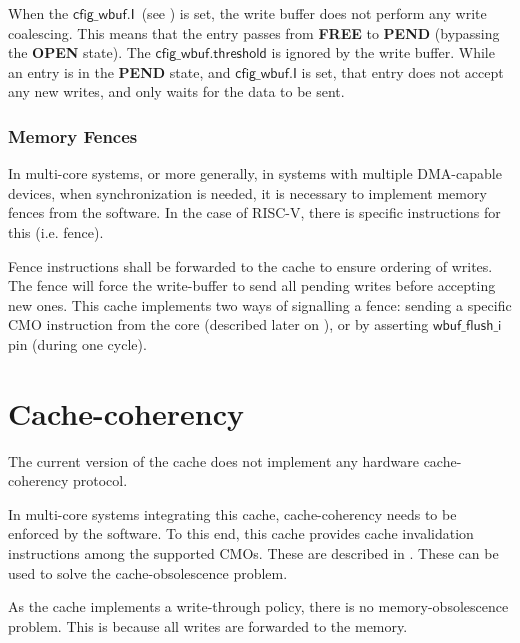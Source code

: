 \documentclass[10pt,titlepage,twoside]{book}
\begin{document}
When the $\mathsf{cfig\_wbuf.I}$~(see ) is set, the write buffer does not perform any write coalescing. This means that the entry passes from \textbf{FREE} to \textbf{PEND} (bypassing the \textbf{OPEN} state). The $\mathsf{cfig\_wbuf.threshold}$ is ignored by the write buffer. While an entry is in the \textbf{PEND} state, and $\mathsf{cfig\_wbuf.I}$ is set, that entry does not accept any new writes, and only waits for the data to be sent.


\subsubsection{Memory Fences}

In multi-core systems, or more generally, in systems with multiple \acs{DMA}-capable devices, when synchronization is needed, it is necessary to implement memory fences from the software.
In the case of RISC-V, there is specific instructions for this (i.e. fence).

Fence instructions shall be forwarded to the cache to ensure ordering of writes. The fence will force the write-buffer to send all pending writes before accepting new ones.
This cache implements two ways of signalling a fence: sending a specific \ac{CMO} instruction from the core (described later on ), or by asserting $\mathsf{wbuf\_flush\_i}$ pin (during one cycle).


\section{Cache-coherency}

The current version of the cache does not implement any hardware cache-coherency protocol.

In multi-core systems integrating this cache, cache-coherency needs to be enforced by the software. To this end, this cache provides cache invalidation instructions among the supported \acp{CMO}. These are described in . These can be used to solve the cache-obsolescence problem.

As the cache implements a write-through policy, there is no memory-obsolescence problem. This is because all writes are forwarded to the memory.
\end{document}
